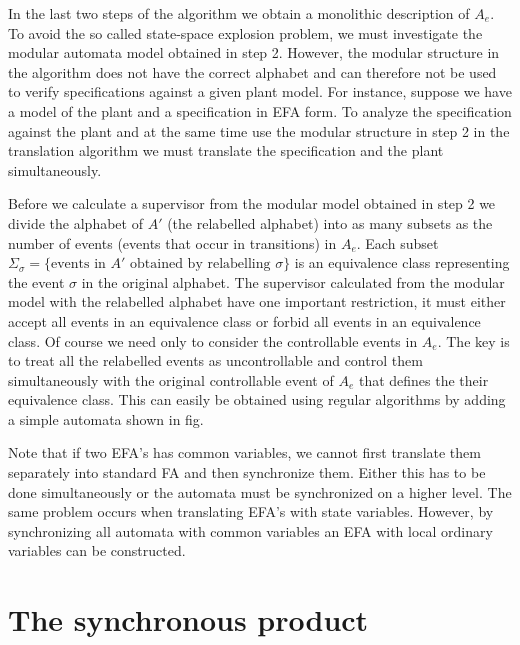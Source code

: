 \documentclass{article}
\begin{document}
In the last two steps  of the algorithm we obtain a monolithic description of $A_e$. To avoid the so called
 state-space explosion problem, we must investigate the modular automata model obtained in step 2. However,
 the modular structure in the algorithm does not have the correct alphabet and can therefore not be used to
 verify specifications against a given plant model. For instance, suppose we have a model of the plant and
 a specification in EFA form. To analyze the specification against the plant and at the same time
use the modular structure in step 2 in the translation algorithm we must translate the
specification and the plant simultaneously.

Before we calculate a supervisor from the modular model obtained in step 2 we divide the alphabet of $A'$ (the
relabelled alphabet)
into as many subsets as the number of events (events that occur in transitions) in $A_e$. Each subset
$\Sigma_\sigma=\{\text{events in } A' \text{ obtained by relabelling } \sigma \}$
is an equivalence class representing the event $\sigma$ in the original alphabet. The supervisor
calculated from the modular model with the relabelled alphabet have one important restriction,
 it must either accept all events in an equivalence class or forbid all events in an equivalence class. Of course
  we need only to consider the controllable events in $A_e$.
 The key is to treat all the relabelled events as uncontrollable and control them
 simultaneously with the original controllable event
 of $A_e$ that defines the their equivalence class. This
 can easily be obtained using regular algorithms by adding a simple automata shown in fig.



Note that if two EFA's has common variables, we cannot first translate them
separately into standard FA and then synchronize them. Either this
has to be done simultaneously or the automata must be synchronized
on a higher level. The same problem occurs when translating EFA's with
state variables. However, by synchronizing all automata with
common variables an EFA with local ordinary variables can be constructed.



\section{The synchronous product}
\end{document}
